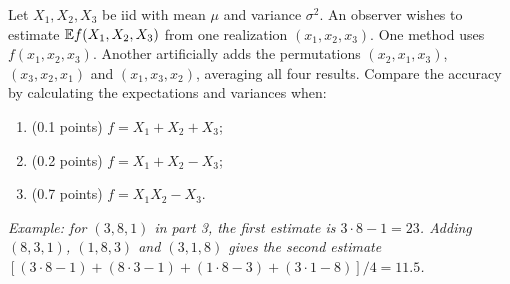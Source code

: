 \documentclass[a4paper]{report}
\begin{document}
\begin{problem}
Let $X_1,X_2,X_3$ be iid with mean $\mu$ and variance $\sigma^2$. An observer wishes to estimate $\mathbb {E} f(X_1,X_2,X_3)$ from one realization $(x_1,x_2,x_3)$. One method uses $f(x_1,x_2,x_3)$. Another artificially adds the permutations $(x_2,x_1,x_3)$, $(x_3,x_2,x_1)$ and $(x_1,x_3,x_2)$, averaging all four results. Compare the accuracy by calculating the expectations and variances when:
\begin{enumerate}
\item (0.1 points) $f=X_1+X_2+X_3$;
\item (0.2 points) $f=X_1+X_2-X_3$;
\item (0.7 points) $f=X_1X_2-X_3$.
\end{enumerate}
\emph{Example: for $(3,8,1)$ in part 3, the first estimate is $3\cdot8-1=23$. Adding $(8,3,1)$, $(1,8,3)$ and $(3,1,8)$ gives the second estimate $[(3\cdot8-1)+(8\cdot3-1)+(1\cdot8-3)+(3\cdot1-8)]/4=11.5$.}
\end{problem}
\end{document}
